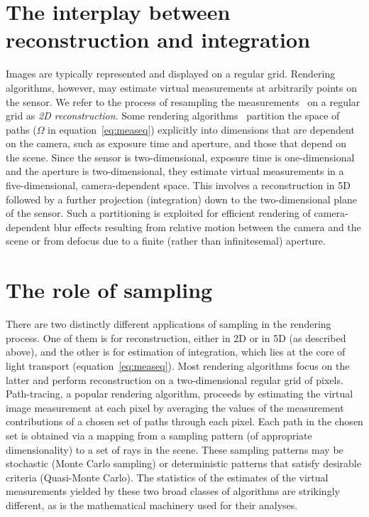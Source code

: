 \documentclass[11pt,fleqn]{book} %
\newcommand{\TBC} {\noindent [TO BE COMPLETED IN THE FINAL VERSION.] }
\begin{document}
\section{The interplay between reconstruction and integration}
Images are typically represented and displayed on a regular grid. Rendering algorithms, however, may estimate virtual measurements at arbitrarily points on the sensor. We refer to the process of resampling the measurements \Ij{}\ on a regular grid as \textit{2D reconstruction}. Some rendering algorithms~\cite{Hachisuka:2008,Egan:2009,Soler:2009} partition the space of paths ($\Omega$ in equation~\ref{eq:measeq}) explicitly into dimensions that are dependent on the camera, such as exposure time and aperture, and those that depend on the scene. Since the sensor is two-dimensional, exposure time is one-dimensional and the aperture is two-dimensional, they estimate virtual measurements in a five-dimensional, camera-dependent space. This involves a reconstruction in 5D followed by a further projection (integration) down to the two-dimensional plane of the sensor. Such a partitioning is exploited for efficient rendering of camera-dependent blur effects resulting from relative motion between the camera and the scene or from defocus due to a finite (rather than infinitesemal) aperture.

\TBC

\section{The role of sampling}
There are two distinctly different applications of sampling in the rendering process. One of them is for reconstruction, either in 2D or in 5D (as described above), and the other is for estimation of integration, which lies at the core of light transport (equation~\ref{eq:measeq}). Most rendering algorithms focus on the latter and perform reconstruction on a two-dimensional regular grid of pixels. Path-tracing, a popular rendering algorithm, proceeds by estimating the virtual image measurement at each pixel by averaging the values of the measurement contributions of a chosen set of paths through each pixel. Each path in the chosen set is obtained via a mapping from a sampling pattern (of appropriate dimensionality) to a set of rays in the scene. These sampling patterns may be stochastic (Monte Carlo sampling) or deterministic patterns that satisfy desirable criteria (Quasi-Monte Carlo). The statistics of the estimates of the virtual measurements yielded by these two broad classes of algorithms are strikingly different, as is the mathematical machinery used for their analyses.  
\end{document}
